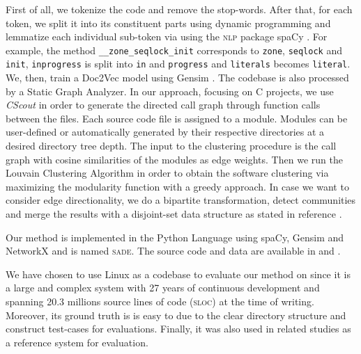 \documentclass[sigconf, screen]{acmart}
\begin{document}
First of all, we tokenize the code and remove the stop-words. 
After that, for each token, we split it into its constituent parts using dynamic programming \cite{wordninja} and lemmatize 
each individual sub-token via using the \textsc{nlp} package spaCy \cite{spacy}. 
For example, the method \texttt{\_\_zone\_seqlock\_init} corresponds to \texttt{zone}, \texttt{seqlock} and \texttt{init}, 
\texttt{inprogress} is split into \texttt{in} and \texttt{progress} and \texttt{literals} becomes \texttt{literal}.
We, then, train a Doc2Vec model using Gensim \cite{gensim}. 
The codebase is also processed by a Static Graph Analyzer. 
In our approach, focusing on C projects, we use \emph{CScout} \cite{cscout} in order to generate the directed call graph through function calls between the files. 
Each source code file is assigned to a module. 
Modules can be user-defined or automatically generated by their respective directories at a desired directory tree depth. 
The input to the clustering procedure
is the call graph with cosine similarities of the modules as edge weights.
Then we run the Louvain Clustering Algorithm \cite{louvain} in
order to obtain the software clustering via maximizing the modularity function with a greedy approach. 
In case we want to consider edge directionality, we do a bipartite transformation, detect communities and
merge the results with a disjoint-set data structure as stated in reference \cite{malliaros}.

Our method is implemented in the Python Language using spaCy\cite{spacy}, Gensim \cite{gensim} and NetworkX \cite{nx} and is named \textsc{sade}. The source code and data are available in \cite{source_code} and \cite{call_graph}. 


We have chosen to use Linux as a codebase to evaluate our method on since it is a large and complex system with 27 years of continuous development and spanning 20.3 millions source lines of code (\textsc{sloc}) at the time of writing.  
Moreover, its ground truth is is easy to due to the clear directory structure and construct test-cases for
evaluations. 
Finally, it was also used in related studies \cite{acdc, evaluation} as a reference system for evaluation.  
\end{document}
